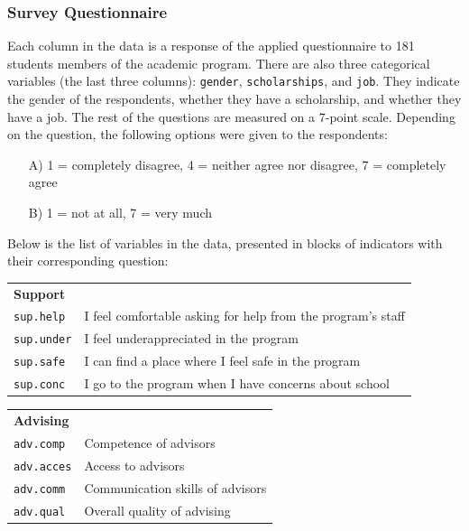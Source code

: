 \documentclass[12pt]{book}\usepackage{graphicx, color}
\newcommand{\code}[1]{\texttt{#1}}
\begin{document}
\subsubsection*{Survey Questionnaire}
Each column in the data is a response of the applied questionnaire to 181 students members of the academic program. There are also three categorical variables (the last three columns): \code{gender}, \code{scholarships}, and \code{job}. They indicate the gender of the respondents, whether they have a scholarship, and whether they have a job. The rest of the questions are measured on a 7-point scale. Depending on the question, the following options were given to the respondents:
\begin{itemize}
 \item[A)] 1 = completely disagree, 4 = neither agree nor disagree, 7 = completely agree
 \item[B)] 1 = not at all, 7 = very much
\end{itemize}

\vspace{2mm}
Below is the list of variables in the data, presented in blocks of indicators with their corresponding question: \\
\begin{tabular}{l l}
 \textbf{Support} & \\
 \code{sup.help} & I feel comfortable asking for help from the program's staff \\
 \code{sup.under} & I feel underappreciated in the program \\
 \code{sup.safe} & I can find a place where I feel safe in the program \\
 \code{sup.conc} & I go to the program when I have concerns about school \\
\end{tabular}

\begin{tabular}{l l}
 \textbf{Advising} & \\
 \code{adv.comp} & Competence of advisors \\
 \code{adv.acces} & Access to advisors \\
 \code{adv.comm} & Communication skills of advisors \\
 \code{adv.qual} & Overall quality of advising \\
\end{tabular}
\end{document}
